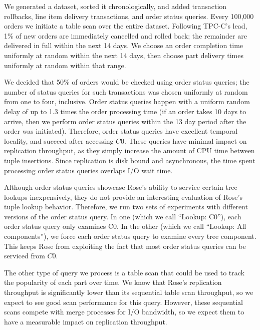 \documentclass{vldb}
\newcommand{\rows}{Rose\xspace}
\newcommand{\rowss}{Rose's\xspace}
\begin{document}
We generated a dataset, sorted it chronologically, and
added transaction rollbacks, line item delivery transactions, and
order status queries.  Every 100,000 orders we initiate a table scan
over the entire dataset.  Following TPC-C's lead, 1\% of new orders are immediately cancelled
and rolled back; the remainder are delivered in full within the
next 14 days.  We choose an order completion time uniformly at
random within the next 14 days, then choose part delivery times
uniformly at random within that range.

We decided that 50\% of orders would be checked
using order status queries; the number of status queries for such
transactions was chosen uniformly at random from one to four, inclusive.
Order status queries happen with a uniform random delay of up to 1.3 times
the order processing time (if an order takes 10 days
to arrive, then we perform order status queries within the 13 day
period after the order was initiated).  Therefore, order status
queries have excellent temporal locality, and succeed after accessing
$C0$.   These queries have minimal impact on replication
throughput, as they simply increase the amount of CPU time between
tuple insertions.  Since replication is disk bound and asynchronous, the time spent
processing order status queries overlaps I/O wait time.

Although order status queries showcase \rowss ability to service
certain tree lookups inexpensively, they do not provide an interesting
evaluation of \rowss tuple lookup behavior.  Therefore, we run two sets
of experiments with different versions of the order status query.  In
one (which we call ``Lookup: C0''), each order status query only examines C0.
In the other (which we call ``Lookup: All components''), we force each order status query
to examine every tree component.  This keeps \rows from exploiting the fact that most order status queries can be serviced from $C0$.

The other type of query we process is a table scan that could be used
to track the popularity of each part over time.  We know that \rowss
replication throughput is significantly lower than its sequential
table scan throughput, so we expect to see good scan performance for
this query.  However, these sequential scans compete with merge
processes for I/O bandwidth, so we expect them to have a measurable impact on
replication throughput.
\end{document}
